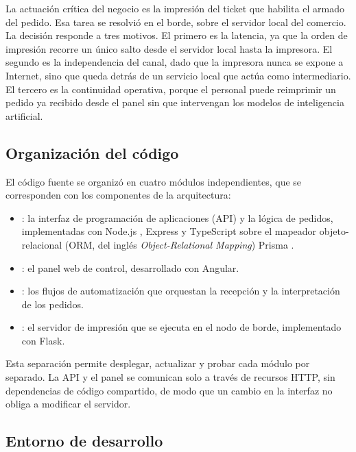 La actuación crítica del negocio es la impresión del ticket que habilita el armado del pedido. Esa tarea se resolvió en el borde, sobre el servidor local del comercio. La decisión responde a tres motivos. El primero es la latencia, ya que la orden de impresión recorre un único salto desde el servidor local hasta la impresora. El segundo es la independencia del canal, dado que la impresora nunca se expone a Internet, sino que queda detrás de un servicio local que actúa como intermediario. El tercero es la continuidad operativa, porque el personal puede reimprimir un pedido ya recibido desde el panel sin que intervengan los modelos de inteligencia artificial.

\subsection{Organización del código}
\label{subsec:organizacion_codigo}

El código fuente se organizó en cuatro módulos independientes, que se corresponden con los componentes de la arquitectura:

\begin{itemize}
  \item {}: la interfaz de programación de aplicaciones (API) y la lógica de pedidos, implementadas con Node.js \cite{nodejs}, Express \cite{express} y TypeScript \cite{typescript} sobre el mapeador objeto-relacional (ORM, del inglés \textit{Object-Relational Mapping}) Prisma \cite{prisma}.
  \item {}: el panel web de control, desarrollado con Angular.
  \item {}: los flujos de automatización que orquestan la recepción y la interpretación de los pedidos.
  \item {}: el servidor de impresión que se ejecuta en el nodo de borde, implementado con Flask.
\end{itemize}

Esta separación permite desplegar, actualizar y probar cada módulo por separado. La API y el panel se comunican solo a través de recursos HTTP, sin dependencias de código compartido, de modo que un cambio en la interfaz no obliga a modificar el servidor.

\subsection{Entorno de desarrollo}
\label{subsec:entorno_desarrollo}

